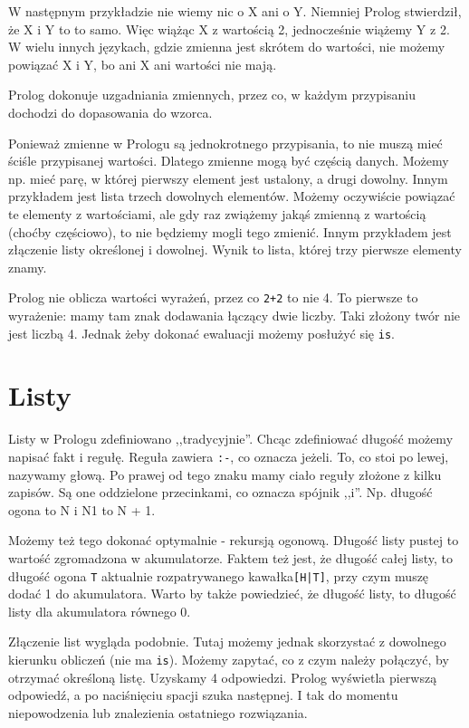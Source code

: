 \documentclass[12pt,a4paper]{article}
\begin{document}
W następnym przykładzie nie wiemy nic o X ani o Y. Niemniej Prolog stwierdził, że X i Y to to samo. Więc wiążąc X z wartością 2, jednocześnie wiążemy Y z 2. W wielu innych językach, gdzie zmienna jest skrótem do wartości, nie możemy powiązać X i Y, bo ani X ani wartości nie mają.

Prolog dokonuje uzgadniania zmiennych, przez co, w każdym przypisaniu dochodzi do dopasowania do wzorca.

Ponieważ zmienne w Prologu są jednokrotnego przypisania, to nie muszą mieć ściśle przypisanej wartości. Dlatego zmienne mogą być częścią danych. Możemy np. mieć parę, w której pierwszy element jest ustalony, a drugi dowolny. Innym przykładem jest lista trzech dowolnych elementów. Możemy oczywiście powiązać te elementy z wartościami, ale gdy raz zwiążemy jakąś zmienną z wartością (choćby częściowo), to nie będziemy mogli tego zmienić. Innym przykładem jest złączenie listy określonej i dowolnej. Wynik to lista, której trzy pierwsze elementy znamy.

Prolog nie oblicza wartości wyrażeń, przez co \verb!2+2! to nie 4. To pierwsze to wyrażenie: mamy tam znak dodawania łączący dwie liczby. Taki złożony twór nie jest liczbą 4. Jednak żeby dokonać ewaluacji możemy posłużyć się \verb+is+.

\section{Listy}
Listy w Prologu zdefiniowano ,,tradycyjnie''. Chcąc zdefiniować długość możemy napisać fakt i regułę. Reguła zawiera \verb+:-+, co oznacza jeżeli. To, co stoi po lewej, nazywamy głową. Po prawej od tego znaku mamy ciało reguły złożone z kilku zapisów. Są one oddzielone przecinkami, co oznacza spójnik ,,i''. Np. długość ogona to N i N1 to N + 1.

Możemy też tego dokonać optymalnie - rekursją ogonową. Długość listy pustej to wartość zgromadzona w akumulatorze. Faktem też jest, że długość całej listy, to długość ogona \verb+T+ aktualnie rozpatrywanego kawałka\verb+[H|T]+, przy czym muszę dodać 1 do akumulatora. Warto by także powiedzieć, że długość listy, to długość listy dla akumulatora równego 0.

Złączenie list wygląda podobnie. Tutaj możemy jednak skorzystać z dowolnego kierunku obliczeń (nie ma \verb+is+). Możemy zapytać, co z czym należy połączyć, by otrzymać określoną listę. Uzyskamy 4 odpowiedzi. Prolog wyświetla pierwszą odpowiedź, a po naciśnięciu spacji szuka następnej. I tak do momentu niepowodzenia lub znalezienia ostatniego rozwiązania.
\end{document}
